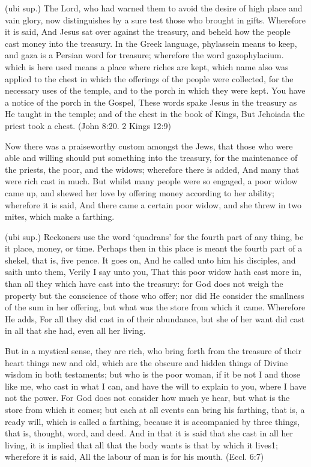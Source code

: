  (ubi sup.) The Lord, who had warned them to avoid the desire of high place and vain glory, now distinguishes by a sure test those who brought in gifts. Wherefore it is said, And Jesus sat over against the treasury, and beheld how the people cast money into the treasury. In the Greek language, phylassein means to keep, and gaza is a Persian word for treasure; wherefore the word gazophylacium. which is here used means a place where riches are kept, which name also was applied to the chest in which the offerings of the people were collected, for the necessary uses of the temple, and to the porch in which they were kept. You have a notice of the porch in the Gospel, These words spake Jesus in the treasury as He taught in the temple; and of the chest in the book of Kings, But Jehoiada the priest took a chest. (John 8:20. 2 Kings 12:9)

 Now there was a praiseworthy custom amongst the Jews, that those who were able and willing should put something into the treasury, for the maintenance of the priests, the poor, and the widows; wherefore there is added, And many that were rich cast in much. But whilst many people were so engaged, a poor widow came up, and shewed her love by offering money according to her ability; wherefore it is said, And there came a certain poor widow, and she threw in two mites, which make a farthing.

 (ubi sup.) Reckoners use the word ‘quadrans’ for the fourth part of any thing, be it place, money, or time. Perhaps then in this place is meant the fourth part of a shekel, that is, five pence. It goes on, And he called unto him his disciples, and saith unto them, Verily I say unto you, That this poor widow hath cast more in, than all they which have cast into the treasury: for God does not weigh the property but the conscience of those who offer; nor did He consider the smallness of the sum in her offering, but what was the store from which it came. Wherefore He adds, For all they did cast in of their abundance, but she of her want did cast in all that she had, even all her living.

 But in a mystical sense, they are rich, who bring forth from the treasure of their heart things new and old, which are the obscure and hidden things of Divine wisdom in both testaments; but who is the poor woman, if it be not I and those like me, who cast in what I can, and have the will to explain to you, where I have not the power. For God does not consider how much ye hear, but what is the store from which it comes; but each at all events can bring his farthing, that is, a ready will, which is called a farthing, because it is accompanied by three things, that is, thought, word, and deed. And in that it is said that she cast in all her living, it is implied that all that the body wants is that by which it lives1; wherefore it is said, All the labour of man is for his mouth. (Eccl. 6:7)

